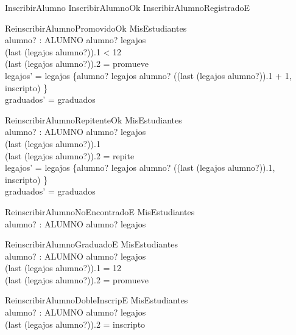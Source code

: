 \begin{zed}
    InscribirAlumno  InscribirAlumnoOk \lor InscribirAlumnoRegistradoE
\end{zed}

\begin{schema}{ReinscribirAlumnoPromovidoOk}
    \Delta MisEstudiantes \\
    alumno? : ALUMNO
    \where
    alumno? \in \dom legajos \\
    (last (legajos alumno?)).1 < 12 \\ 
    (last (legajos alumno?)).2 = promueve \\
    legajos' = legajos \oplus \{alumno? \mapsto legajos alumno? \cat \langle ((last (legajos alumno?)).1 + 1, inscripto) \rangle\} \\
    graduados' = graduados
\end{schema}

\begin{schema}{ReinscribirAlumnoRepitenteOk}
    \Delta MisEstudiantes \\
    alumno? : ALUMNO
    \where
    alumno? \in \dom legajos \\
    (last (legajos alumno?)).1  \\ 
    (last (legajos alumno?)).2 = repite \\
    legajos' = legajos \oplus \{alumno? \mapsto legajos alumno? \cat \langle ((last (legajos alumno?)).1, inscripto) \rangle\} \\
    graduados' = graduados
\end{schema}

\begin{schema}{ReinscribirAlumnoNoEncontradoE}
    \Xi MisEstudiantes \\
    alumno? : ALUMNO
    \where
    alumno? \notin \dom legajos
\end{schema}

\begin{schema}{ReinscribirAlumnoGraduadoE}
    \Xi MisEstudiantes \\
    alumno? : ALUMNO
    \where
    alumno? \in \dom legajos \\
    (last (legajos alumno?)).1 = 12 \\
    (last (legajos alumno?)).2 = promueve
\end{schema}

\begin{schema}{ReinscribirAlumnoDobleInscripE}
    \Xi MisEstudiantes \\
    alumno? : ALUMNO
    \where
    alumno? \in \dom legajos \\
    (last (legajos alumno?)).2 = inscripto
\end{schema}

